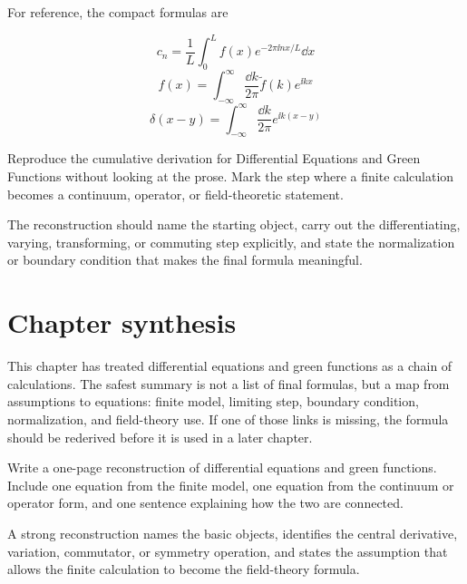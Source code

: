 For reference, the compact formulas are

\[
  c_n=\frac1L\int_0^L f(x)e^{-2\pi\ii nx/L}\dd x
\]
\[
  f(x)=\int_{-\infty}^{\infty}\frac{\dd k}{2\pi}\tilde f(k)e^{\ii kx}
\]
\[
  \delta(x-y)=\int_{-\infty}^{\infty}\frac{\dd k}{2\pi}e^{\ii k(x-y)}
\]

\begin{exercise}
Reproduce the cumulative derivation for Differential Equations and Green Functions without looking at the prose.  Mark the step where a finite calculation becomes a continuum, operator, or field-theoretic statement.
\begin{answer}
The reconstruction should name the starting object, carry out the differentiating, varying, transforming, or commuting step explicitly, and state the normalization or boundary condition that makes the final formula meaningful.
\end{answer}
\end{exercise}



\section{Chapter synthesis}

This chapter has treated differential equations and green functions as a chain of calculations.  The safest summary is not a list of final formulas, but a map from assumptions to equations: finite model, limiting step, boundary condition, normalization, and field-theory use.  If one of those links is missing, the formula should be rederived before it is used in a later chapter.

\begin{exercise}
Write a one-page reconstruction of differential equations and green functions.  Include one equation from the finite model, one equation from the continuum or operator form, and one sentence explaining how the two are connected.
\begin{answer}
A strong reconstruction names the basic objects, identifies the central derivative, variation, commutator, or symmetry operation, and states the assumption that allows the finite calculation to become the field-theory formula.
\end{answer}
\end{exercise}

